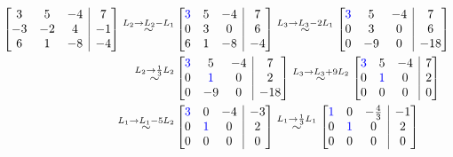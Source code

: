 \documentclass{article}
\begin{document}
\begin{align*}
\left[
\begin{array}{@{}ccc|c@{}}
3 & 5 & -4 & 7 \\
-3 & -2 & 4 & -1\\
6 & 1 & -8 & -4
\end{array}
\right]
\overset{L_2 \to L_2 - L_1}{\sim}
&\left[
\begin{array}{@{}ccc|c@{}}
\color{blue}3 & 5 & -4 & 7 \\
0 & 3 & 0 & 6\\
6 & 1 & -8 & -4\\
\end{array}
\right]
\overset{L_3 \to L_3 - 2L_1}{\sim}
\left[
\begin{array}{@{}ccc|c@{}}
\color{blue}3 & 5 & -4 & 7 \\
0 & 3 & 0 & 6\\
0 & -9 & 0 & -18\\
\end{array}
\right]\\
\overset{L_2 \to \frac{1}{3}L_2}{\sim}
&\left[
\begin{array}{@{}ccc|c@{}}
\color{blue}3 & 5 & -4 & 7 \\
0 & \color{blue}1 & 0 & 2\\
0 & -9 & 0 & -18\\
\end{array}
\right]
\overset{L_3 \to L_3 + 9L_2}{\sim}
\left[
\begin{array}{@{}ccc|c@{}}
\color{blue}3 & 5 & -4 & 7 \\
0 & \color{blue}1 & 0 & 2\\
0 & 0 & 0 & 0\\
\end{array}
\right]\\
\overset{L_1 \to L_1 - 5L_2}{\sim}
&\left[
\begin{array}{@{}ccc|c@{}}
\color{blue}3 & 0 & -4 & -3 \\
0 & \color{blue}1 & 0 & 2\\
0 & 0 & 0 & 0\\
\end{array}
\right]
\overset{L_1 \to \frac{1}{3}L_1}{\sim}
\left[
\begin{array}{@{}ccc|c@{}}
\color{blue}1 & 0 & -\frac{4}{3} & -1 \\
0 & \color{blue}1 & 0 & 2\\
0 & 0 & 0 & 0\\
\end{array}
\right]
\end{align*}
\end{document}
